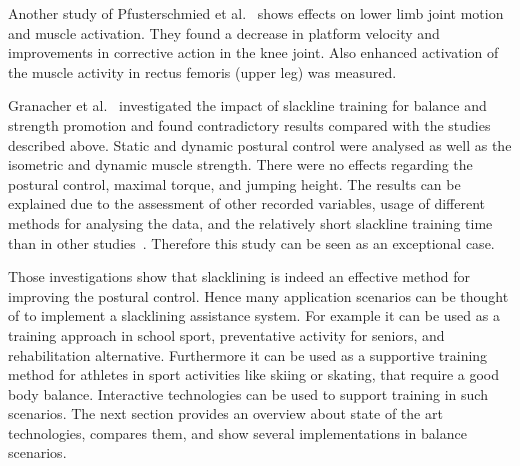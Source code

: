 Another study of Pfusterschmied et al.~\cite{Pfusterschmied2013-kq} shows effects on lower limb joint motion and muscle activation. They found a decrease in platform velocity and improvements in corrective action in the knee joint. Also enhanced activation of the muscle activity in rectus femoris (upper leg) was measured.

Granacher et al.~\cite{Granacher2010-ow} investigated the impact of slackline training for balance and strength promotion and found contradictory results compared with the studies described above. Static and dynamic postural control were analysed as well as the isometric and dynamic muscle strength. There were no effects regarding the postural control, maximal torque, and jumping height. The results can be explained due to the assessment of other recorded variables, usage of different methods for analysing the data, and the relatively short slackline training time than in other studies~\cite{Pfusterschmied2013-yy}. Therefore this study can be seen as an exceptional case.

Those investigations show that slacklining is indeed an effective method for improving the postural control. Hence many application scenarios can be thought of to implement a slacklining assistance system. For example it can be used as a training approach in school sport, preventative activity for seniors, and rehabilitation alternative. Furthermore it can be used as a supportive training method for athletes in sport activities like skiing or skating, that require a good body balance. Interactive technologies can be used to support training in such scenarios. The next section provides an overview about state of the art technologies, compares them, and show several implementations in balance scenarios.